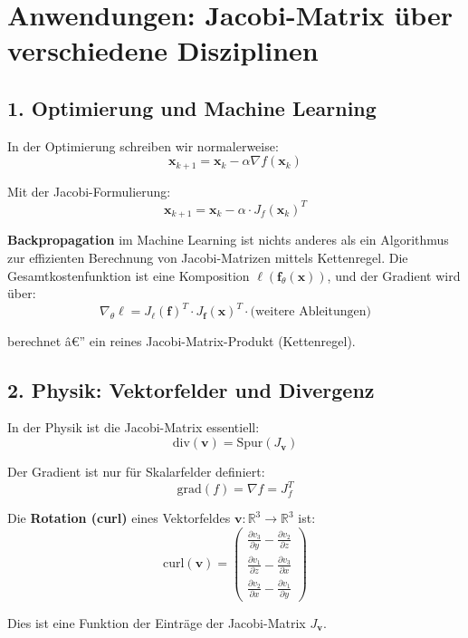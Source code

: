 ﻿\documentclass[a4paper,12pt]{article}
\theoremstyle{definition}
\begin{document}
\section{Anwendungen: Jacobi-Matrix über verschiedene Disziplinen}

\subsection{1. Optimierung und Machine Learning}

In der Optimierung schreiben wir normalerweise:
\[
\boldsymbol{x}_{k+1} = \boldsymbol{x}_k - \alpha \nabla f(\boldsymbol{x}_k)
\]

Mit der Jacobi-Formulierung:
\[
\boldsymbol{x}_{k+1} = \boldsymbol{x}_k - \alpha \cdot J_f(\boldsymbol{x}_k)^T
\]

\textbf{Backpropagation} im Machine Learning ist nichts anderes als ein Algorithmus zur effizienten Berechnung von Jacobi-Matrizen mittels Kettenregel. Die Gesamtkostenfunktion ist eine Komposition $\ell(\boldsymbol{f}_{\theta}(\boldsymbol{x}))$, und der Gradient wird über:
\[
\nabla_{\theta} \ell = J_{\ell}(\boldsymbol{f})^T \cdot J_{\boldsymbol{f}}(\boldsymbol{x})^T \cdot \text{(weitere Ableitungen)}
\]

berechnet â€” ein reines Jacobi-Matrix-Produkt (Kettenregel).

\subsection{2. Physik: Vektorfelder und Divergenz}

In der Physik ist die Jacobi-Matrix essentiell:
\[
\text{div}(\boldsymbol{v}) = \text{Spur}(J_{\boldsymbol{v}})
\]

Der Gradient ist nur für Skalarfelder definiert:
\[
\text{grad}(f) = \nabla f = J_f^T
\]

Die \textbf{Rotation (curl)} eines Vektorfeldes $\boldsymbol{v}: \mathbb{R}^3 \to \mathbb{R}^3$ ist:
\[
\text{curl}(\boldsymbol{v}) = \begin{pmatrix} 
	\frac{\partial v_3}{\partial y} - \frac{\partial v_2}{\partial z} \\
	\frac{\partial v_1}{\partial z} - \frac{\partial v_3}{\partial x} \\
	\frac{\partial v_2}{\partial x} - \frac{\partial v_1}{\partial y}
\end{pmatrix}
\]

Dies ist eine Funktion der Einträge der Jacobi-Matrix $J_{\boldsymbol{v}}$.
\end{document}
